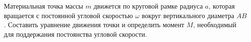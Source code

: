 Материальная точка массы $m$ движется по круговой рамке радиуса $a$,
которая вращается с постоянной угловой скоростью $\omega$
вокруг вертикального диаметра $AB$.
Составить уравнение движения точки и определить момент $M$,
необходимый для поддержания постоянства угловой скорости.
